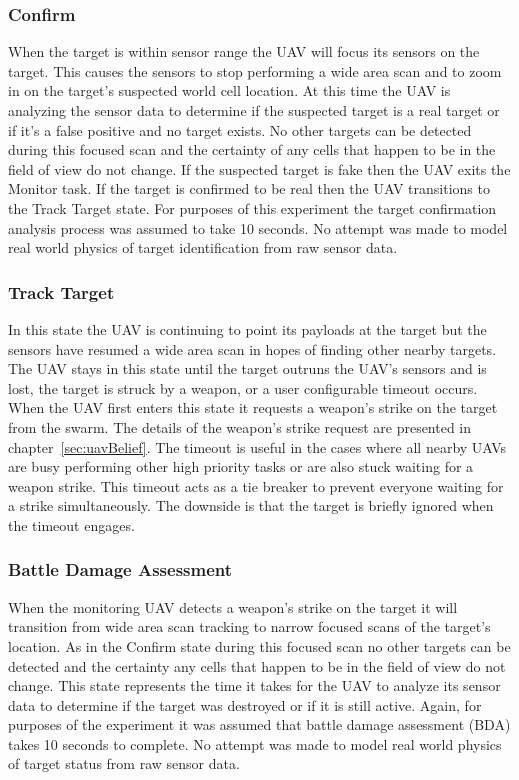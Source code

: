 \begin{multicols*}{2}

\subsubsection{Confirm}
When the target is within sensor range the UAV will focus its sensors on the target.  This causes the sensors to stop performing a wide area scan and to zoom in on the target's suspected world cell location.  At this time the UAV is analyzing the sensor data to determine if the suspected target is a real target or if it's a false positive and no target exists.  No other targets can be detected during this focused scan and the certainty of any cells that happen to be in the field of view do not change.  If the suspected target is fake then the UAV exits the Monitor task.  If the target is confirmed to be real then the UAV transitions to the Track Target state.  For purposes of this experiment the target confirmation analysis process was assumed to take 10 seconds.  No attempt was made to model real world physics of target identification from raw sensor data.

\subsubsection{Track Target}
In this state the UAV is continuing to point its payloads at the target but the sensors have resumed a wide area scan in hopes of finding other nearby targets.  The UAV stays in this state until the target outruns the UAV's sensors and is lost, the target is struck by a weapon, or a user configurable timeout occurs.  When the UAV first enters this state it requests a weapon's strike on the target from the swarm.  The details of the weapon's strike request are presented in chapter~\ref{sec:uavBelief}.  The timeout is useful in the cases where all nearby UAVs are busy performing other high priority tasks or are also stuck waiting for a weapon strike.  This timeout acts as a tie breaker to prevent everyone waiting for a strike simultaneously.  The downside is that the target is briefly ignored when the timeout engages.

\subsubsection{Battle Damage Assessment}
When the monitoring UAV detects a weapon's strike on the target it will transition from wide area scan tracking to narrow focused scans of the target's location.  As in the Confirm state during this focused scan no other targets can be detected and the certainty any cells that happen to be in the field of view do not change.  This state represents the time it takes for the UAV to analyze its sensor data to determine if the target was destroyed or if it is still active.  Again, for purposes of the experiment it was assumed that battle damage assessment (BDA) takes 10 seconds to complete.  No attempt was made to model real world physics of target status from raw sensor data.


\end{multicols*}
